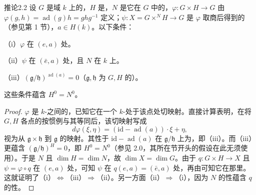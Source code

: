 \begin{SGAresult}{推论}{2.2}
设 $G$ 是域 $k$ 上的，$H$ 是，$N$ 是它在 $G$ 中的，$\varphi:G\times H\to G$ 由 $\varphi(g,h)=\operatorname{ad}(g)h=ghg^{-1}$ 定义；$\psi:X=G\times^N H\to G$ 是 $\varphi$ 取商后得到的（参见第 1 节），$a\in H(k)$。以下条件：

（i）$\varphi$ 在 $(e,a)$ 处。

（ii）$\psi$ 在 $(\bar e,a)$ 处，且 $N$ 在 $k$ 上。

（iii）$(\mathfrak g/\mathfrak h)^{\operatorname{ad}(a)}=0$（$\mathfrak g,\mathfrak h$ 为 $G,H$ 的）。

这些条件蕴含 $H^0=N^0$。
\end{SGAresult}
\begin{proof}
$\varphi$ 是 $k$-之间的，已知它在一个 $k$-处于该点处切映射。直接计算表明，在将 $G,H$ 各点的按惯例与其等同后，该切映射写成
\[d\varphi(\xi,\eta)=(\mathrm{id}-\operatorname{ad}(a))\cdot\xi+\eta,\]
视为从 $\mathfrak g\times\mathfrak h$ 到 $\mathfrak g$ 的映射。其性于 $\mathrm{id}-\operatorname{ad}(a)$ 在 $\mathfrak g/\mathfrak h$ 上为，即（iii）。而（iii）更蕴含 $(\mathfrak g/\mathfrak h)^H=0$，即 $H^0=N^0$（参见 2.0，其所在节开头的假设在此无须使用）。于是 $N$ 且 $\dim H=\dim N$，故 $\dim X=\dim G$。由于 $q:G\times H\to X$ 且 $\psi=\varphi\circ q$ 在 $(e,a)$ 处，可知 $\psi$ 在 $q(e,a)=(\bar e,a)$ 处，再由可知它在那里。这就证明了（i）$\Leftrightarrow$（iii）$\Rightarrow$（ii）。另一方面（ii）$\Rightarrow$（i），因为 $N$ 的性蕴含 $q$ 的性。
\end{proof}
